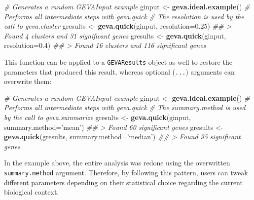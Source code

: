 \documentclass[
  12pt,
]{article}
\newenvironment{Shaded}{\begin{snugshade}}{\end{snugshade}}
\newcommand{\CommentTok}[1]{\textcolor[rgb]{0.56,0.35,0.01}{\textit{#1}}}
\newcommand{\DataTypeTok}[1]{\textcolor[rgb]{0.13,0.29,0.53}{#1}}
\newcommand{\FloatTok}[1]{\textcolor[rgb]{0.00,0.00,0.81}{#1}}
\newcommand{\KeywordTok}[1]{\textcolor[rgb]{0.13,0.29,0.53}{\textbf{#1}}}
\newcommand{\NormalTok}[1]{#1}
\newcommand{\StringTok}[1]{\textcolor[rgb]{0.31,0.60,0.02}{#1}}
\begin{document}
\begin{Shaded}
\begin{Highlighting}[]
\CommentTok{# Generates a random GEVAInput example}
\NormalTok{ginput <-}\StringTok{ }\KeywordTok{geva.ideal.example}\NormalTok{()}
\CommentTok{# Performs all intermediate steps with geva.quick}
\CommentTok{# The resolution is used by the call to geva.cluster}
\NormalTok{gresults <-}\StringTok{ }\KeywordTok{geva.quick}\NormalTok{(ginput, }\DataTypeTok{resolution=}\FloatTok{0.25}\NormalTok{)}
\CommentTok{## > Found 4 clusters and 31 significant genes}
\NormalTok{gresults <-}\StringTok{ }\KeywordTok{geva.quick}\NormalTok{(ginput, }\DataTypeTok{resolution=}\FloatTok{0.4}\NormalTok{)}
\CommentTok{## > Found 16 clusters and 116 significant genes}
\end{Highlighting}
\end{Shaded}

This function can be applied to a \texttt{GEVAResults} object as well to
restore the parameters that produced this result, whereas optional
(\texttt{...}) arguments can overwrite them:

\begin{Shaded}
\begin{Highlighting}[]
\CommentTok{# Generates a random GEVAInput example}
\NormalTok{ginput <-}\StringTok{ }\KeywordTok{geva.ideal.example}\NormalTok{()}
\CommentTok{# Performs all intermediate steps with geva.quick}
\CommentTok{# The summary.method is used by the call to geva.summarize}
\NormalTok{gresults <-}\StringTok{ }\KeywordTok{geva.quick}\NormalTok{(ginput, }\DataTypeTok{summary.method=}\StringTok{'mean'}\NormalTok{)}
\CommentTok{## > Found 60 significant genes}
\NormalTok{gresults <-}\StringTok{ }\KeywordTok{geva.quick}\NormalTok{(gresults, }\DataTypeTok{summary.method=}\StringTok{'median'}\NormalTok{)}
\CommentTok{## > Found 95 significant genes}
\end{Highlighting}
\end{Shaded}

In the example above, the entire analysis was redone using the
overwritten \texttt{summary.method} argument. Therefore, by following
this pattern, users can tweak different parameters depending on their
statistical choice regarding the current biological context.
\end{document}

